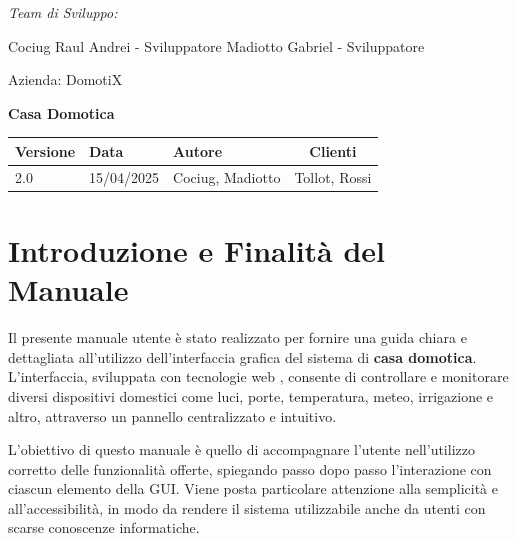 \documentclass[a4paper,12pt]{article}
\begin{document}
\begin{titlepage}
    \begin{minipage}[t]{0.4\textwidth}
    \raggedright
    {\large\itshape Team di Sviluppo:\par}
    \vspace{0.2cm}
    
    Cociug Raul Andrei - Sviluppatore 
    Madiotto Gabriel - Sviluppatore
    \end{minipage}
    \hfill
    \begin{minipage}[t]{0.4\textwidth}
    \raggedleft
    {\Large Azienda: DomotiX\par}
    \end{minipage}
    
    \centering
    \vspace*{5cm}
    
    {\Huge\bfseries Casa Domotica\par}
    \vspace{1.5cm}
    
    \vfill
    
    \begin{table}[h]
    \centering
    \begin{tabular}{@{}lllc@{}}
    \toprule
    Versione & Data & Autore & Clienti \\  
    \midrule
    2.0 & 15/04/2025 & Cociug, Madiotto & Tollot, Rossi \\
    \bottomrule
    \end{tabular}
    \end{table}
    
    \thispagestyle{empty}
\end{titlepage}
\tableofcontents
\newpage

\section{Introduzione e Finalità del Manuale}

Il presente manuale utente è stato realizzato per fornire una guida chiara e dettagliata all'utilizzo dell’interfaccia grafica del sistema di \textbf{casa domotica}. L’interfaccia, sviluppata con tecnologie web , consente di controllare e monitorare diversi dispositivi domestici come luci, porte, temperatura, meteo, irrigazione e altro, attraverso un pannello centralizzato e intuitivo.

L’obiettivo di questo manuale è quello di accompagnare l’utente nell’utilizzo corretto delle funzionalità offerte, spiegando passo dopo passo l’interazione con ciascun elemento della GUI. Viene posta particolare attenzione alla semplicità e all’accessibilità, in modo da rendere il sistema utilizzabile anche da utenti con scarse conoscenze informatiche.
\end{document}
